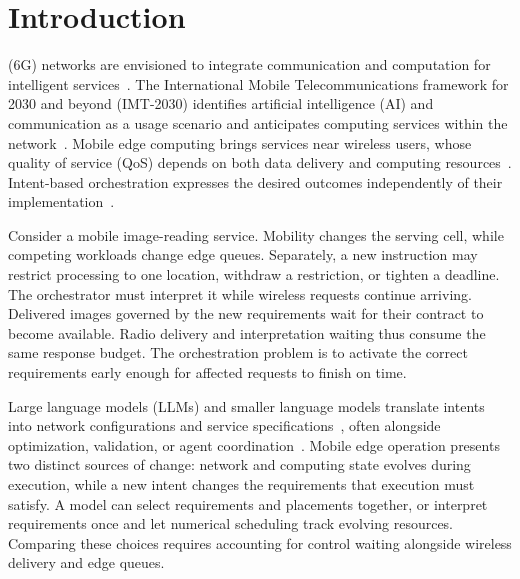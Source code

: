\section{Introduction}
 (6G) networks are envisioned to integrate communication and computation for intelligent services~\cite{letaief2019roadmap}. The International Mobile Telecommunications framework for 2030 and beyond (IMT-2030) identifies artificial intelligence (AI) and communication as a usage scenario and anticipates computing services within the network~\cite{itu2023imt}. Mobile edge computing brings services near wireless users, whose quality of service (QoS) depends on both data delivery and computing resources~\cite{shi2016edge,mao2017survey}. Intent-based orchestration expresses the desired outcomes independently of their implementation~\cite{clemm2022intentbased}.

Consider a mobile image-reading service. Mobility changes the serving cell, while competing workloads change edge queues. Separately, a new instruction may restrict processing to one location, withdraw a restriction, or tighten a deadline. The orchestrator must interpret it while wireless requests continue arriving. Delivered images governed by the new requirements wait for their contract to become available. Radio delivery and interpretation waiting thus consume the same response budget. The orchestration problem is to activate the correct requirements early enough for affected requests to finish on time.

Large language models (LLMs) and smaller language models translate intents into network configurations and service specifications~\cite{jacobs2021hey,angi2025llnet,wang2024netconfeval}, often alongside optimization, validation, or agent coordination~\cite{miyaoka2025chatdriven,martins2026intentdriven,parra-ullauri2026rolebased}. Mobile edge operation presents two distinct sources of change: network and computing state evolves during execution, while a new intent changes the requirements that execution must satisfy. A model can select requirements and placements together, or interpret requirements once and let numerical scheduling track evolving resources. Comparing these choices requires accounting for control waiting alongside wireless delivery and edge queues.


